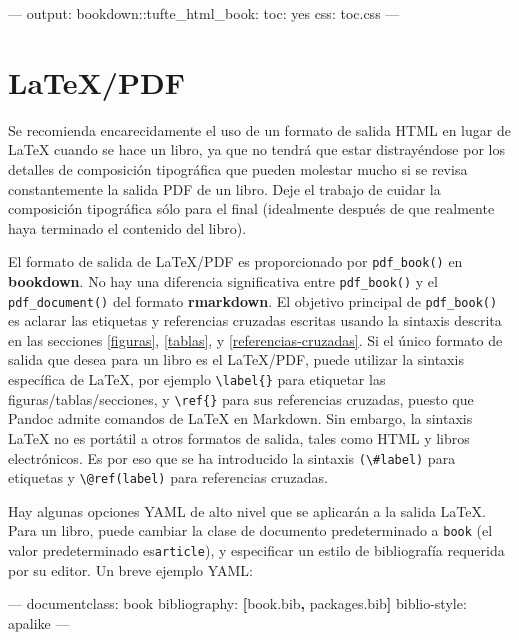 \documentclass[12pt,]{krantz}
\makeatletter
\newenvironment{Shaded}{\begin{snugshade}}{\end{snugshade}}
\newcommand{\KeywordTok}[1]{\textcolor[rgb]{0.13,0.29,0.53}{\textbf{{#1}}}}
\newcommand{\OtherTok}[1]{\textcolor[rgb]{0.56,0.35,0.01}{{#1}}}
\newcommand{\FunctionTok}[1]{\textcolor[rgb]{0.00,0.00,0.00}{{#1}}}
\newcommand{\NormalTok}[1]{{#1}}
\newenvironment{kframe}{%
\medskip{}
\setlength{\fboxsep}{.8em}
 \def\at@end@of@kframe{}%
 \ifinner\ifhmode%
  \def\at@end@of@kframe{\end{minipage}}%
  \begin{minipage}{\columnwidth}%
 \fi\fi%
 \def\FrameCommand##1{\hskip\@totalleftmargin \hskip-\fboxsep
 \colorbox{shadecolor}{##1}\hskip-\fboxsep
     \hskip-\linewidth \hskip-\@totalleftmargin \hskip\columnwidth}%
 \MakeFramed {\advance\hsize-\width
   \@totalleftmargin\z@ \linewidth\hsize
   \@setminipage}}%
 {\par\unskip\endMakeFramed%
 \at@end@of@kframe}
\renewenvironment{Shaded}{\begin{kframe}}{\end{kframe}}
\theoremstyle{definition}
\theoremstyle{definition}
\theoremstyle{remark}
\makeatother
\begin{document}
\begin{Shaded}
\begin{Highlighting}[]
\OtherTok{---}
\FunctionTok{output:}
  \FunctionTok{bookdown:}\NormalTok{:tufte_html_book:}
    \FunctionTok{toc:} \NormalTok{yes}
    \FunctionTok{css:} \NormalTok{toc.css}
\OtherTok{---}
\end{Highlighting}
\end{Shaded}

\section{LaTeX/PDF}\label{latexpdf}

Se recomienda encarecidamente el uso de un formato de salida HTML en
lugar de LaTeX cuando se hace un libro, ya que no tendrá que estar
distrayéndose por los detalles de composición tipográfica que pueden
molestar mucho si se revisa constantemente la salida PDF de un libro.
Deje el trabajo de cuidar la composición tipográfica sólo para el final
(idealmente después de que realmente haya terminado el contenido del
libro).

El formato de salida de LaTeX/PDF es proporcionado por
\texttt{pdf\_book()} en \textbf{bookdown}. No hay una diferencia
significativa entre \texttt{pdf\_book()} y el \texttt{pdf\_document()}
del formato \textbf{rmarkdown}. El objetivo principal de
\texttt{pdf\_book()} es aclarar las etiquetas y referencias cruzadas
escritas usando la sintaxis descrita en las secciones \ref{figuras},
\ref{tablas}, y \ref{referencias-cruzadas}. Si el único formato de
salida que desea para un libro es el LaTeX/PDF, puede utilizar la
sintaxis específica de LaTeX, por ejemplo
\texttt{\textbackslash{}label\{\}} para etiquetar las
figuras/tablas/secciones, y \texttt{\textbackslash{}ref\{\}} para sus
referencias cruzadas, puesto que Pandoc admite comandos de LaTeX en
Markdown. Sin embargo, la sintaxis LaTeX no es portátil a otros formatos
de salida, tales como HTML y libros electrónicos. Es por eso que se ha
introducido la sintaxis \texttt{(\textbackslash{}\#label)} para
etiquetas y \texttt{\textbackslash{}@ref(label)} para referencias
cruzadas.

Hay algunas opciones YAML de alto nivel que se aplicarán a la salida
LaTeX. Para un libro, puede cambiar la clase de documento predeterminado
a \texttt{book} (el valor predeterminado es\texttt{article}), y
especificar un estilo de bibliografía requerida por su editor. Un breve
ejemplo YAML:

\begin{Shaded}
\begin{Highlighting}[]
\OtherTok{---}
\FunctionTok{documentclass:} \NormalTok{book}
\FunctionTok{bibliography:} \KeywordTok{[}\NormalTok{book.bib}\KeywordTok{,} \NormalTok{packages.bib}\KeywordTok{]}
\FunctionTok{biblio-style:} \NormalTok{apalike}
\OtherTok{---}
\end{Highlighting}
\end{Shaded}
\end{document}
